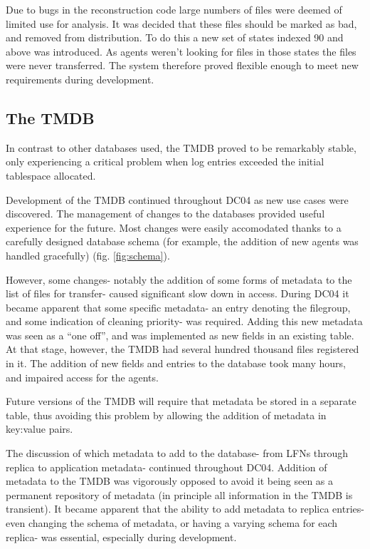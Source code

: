 \documentclass{cmspaper}
\begin{document}
Due to bugs in the reconstruction code large numbers of files were
deemed of limited use for analysis. It was decided that these files
should be marked as bad, and removed from distribution. To do this a
new set of states indexed 90 and above was introduced. As agents
weren't looking for files in those states the files were never
transferred. The system therefore proved flexible enough to meet new
requirements during development.

\subsection{The TMDB}
In contrast to other databases used, the TMDB proved to be remarkably
stable, only experiencing a critical problem when log entries exceeded
the initial tablespace allocated.

Development of the TMDB continued throughout DC04 as new use cases
were discovered. The management of changes to the databases provided
useful experience for the future. Most changes were easily accomodated
thanks to a carefully designed database schema (for example, the
addition of new agents was handled gracefully)
(fig. \ref{fig:schema}).

However, some changes- notably the addition of some forms of metadata
to the list of files for transfer- caused significant slow down in
access. During DC04 it became apparent that some specific metadata- an
entry denoting the filegroup, and some indication of cleaning
priority- was required. Adding this new metadata was seen as a ``one
off'', and was implemented as new fields in an existing table. At that
stage, however, the TMDB had several hundred thousand files registered
in it. The addition of new fields and entries to the database took
many hours, and impaired access for the agents.

Future versions of the TMDB will require that metadata be stored in a
separate table, thus avoiding this problem by allowing the addition of
metadata in key:value pairs.

The discussion of which metadata to add to the database- from LFNs
through replica to application metadata- continued throughout
DC04. Addition of metadata to the TMDB was vigorously opposed to avoid
it being seen as a permanent repository of metadata (in principle all
information in the TMDB is transient). It became apparent that the
ability to add metadata to replica entries- even changing the schema
of metadata, or having a varying schema for each replica- was
essential, especially during development.
\end{document}
